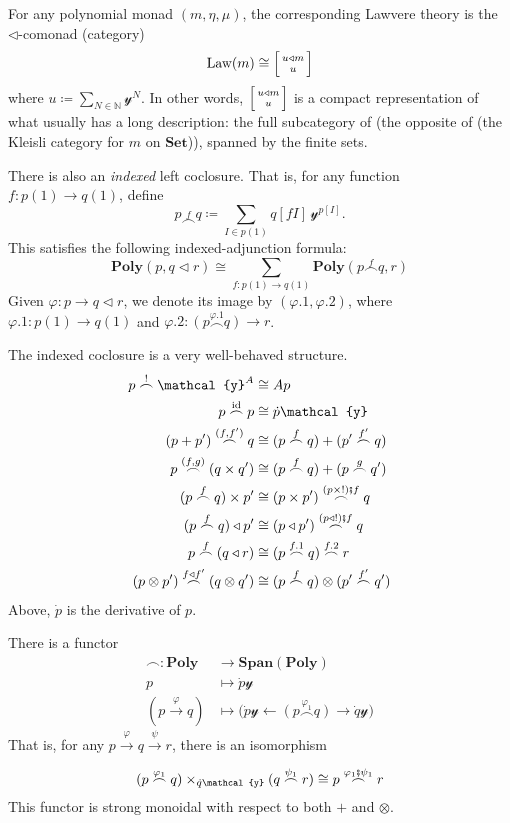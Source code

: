\documentclass[11pt, one side, article]{memoir}
\makeatletter
\theoremstyle{definition}
\theoremstyle{plain}
\newcommand{\Cat}[1]{\mathbf{#1}}%
\newcommand{\id}{\mathrm{id}}
\newcommand{\then}{\mathbin{\fatsemi}}
\newcommand{\To}[2][]{\xrightarrow[#1]{#2}}
\newcommand{\from}{\leftarrow}
\newcommand{\nn}{\mathbb{N}}
\newcommand{\smset}{\Cat{Set}}
\newcommand{\yon}{\mathcal{y}}
\newcommand{\poly}{\Cat{Poly}}
\newcommand{\Span}{\Cat{Span}}
\newcommand{\0}{\textsf{0}}
\newcommand{\1}{\tn{\textsf{1}}}
\newcommand{\tri}{\mathbin{\triangleleft}}
\newcommand{\bigcocl}[2]{
     \begin{bmatrix}{\vphantom{f_f^f}#2} \\ {\vphantom{f_f^f}#1} \end{bmatrix}
}
\newcommand{\littlecocl}[2]{
     \begin{bsmallmatrix}{\vphantom{f}#2} \\ {\vphantom{f}#1} \end{bsmallmatrix}
}
\newcommand{\cocr}[2]{
  \relax\if@display
     \bigcocl{#1}{#2}
  \else
     \littlecocl{#1}{#2}
  \fi
}
\newcommand{\cocl}[1]{\overset{#1}{\frown}}
\makeatother
\begin{document}
For any polynomial monad $(m,\eta,\mu)$, the corresponding Lawvere theory is the $\tri$-comonad (category)
\begin{equation}
	\text{Law}(m)\cong\cocr{u}{u\tri m}
\end{equation}
where $u\coloneqq\sum_{N\in\nn}\yon^N$. In other words, $\cocr{u}{u\tri m}$ is a compact representation of what usually has a long description: the full subcategory of (the opposite of (the Kleisli category for $m$ on $\smset$)), spanned by the finite sets.

There is also an \emph{indexed} left coclosure. That is, for any function $f\colon p(1)\to q(1)$, define
\begin{equation}
	p\cocl{f}q\coloneqq \sum_{I\in p(1)}q[fI]\,\yon^{p[I]}.
\end{equation}
This satisfies the following indexed-adjunction formula:
\begin{equation}
	\poly(p,q\tri r)\cong\sum_{f\colon p(1)\to q(1)}\poly(p\cocl{f}q,r)
\end{equation}
Given $\varphi\colon p\to q\tri r$, we denote its image by $(\varphi.1,\varphi.2)$, where $\varphi.1\colon p(1)\to q(1)$ and $\varphi.2\colon (p\cocl{\varphi.1}q)\to r$.

The indexed coclosure is a very well-behaved structure.
\begin{align*}
	p\cocl{!}\yon^A&\cong Ap\\
	p\cocl{\id}p&\cong\dot{p}\yon\\
	(p+p')\cocl{(f,f')}q&\cong(p\cocl{f}q)+(p'\cocl{f'}q)\\
	p\cocl{(f,g)}(q\times q')&\cong(p\cocl{f}q)+(p\cocl{g}q')\\
	(p\cocl{f}q)\times p'&\cong(p\times p')\cocl{(p\times!)\then f}q\\
	(p\cocl{f}q)\tri p'&\cong(p\tri p')\cocl{(p\tri!)\then f}q\\
	p\cocl{f}(q\tri r)&\cong(p\cocl{f.1}q)\cocl{f.2}r\\
	(p\otimes p')\cocl{f\tri f'}(q\otimes q')&\cong(p\cocl{f}q)\otimes(p'\cocl{f'}q')\\
\end{align*}
Above, $\dot{p}$ is the derivative of $p$.

There is a functor
\begin{equation}
\begin{aligned}
	\frown\colon\poly&\to\Span(\poly)\\
	p&\mapsto\dot{p}\yon\\
	(p\To{\varphi}q)&\mapsto\big(\dot{p}\yon\from(p\cocl{\varphi_1}q)\to\dot{q}\yon\big)
\end{aligned}
\end{equation}
That is, for any $p\To{\varphi}q\To{\psi}r$, there is an isomorphism
\begin{equation}
	(p\cocl{\varphi_1}q)\times_{\dot{q}\yon}(q\cocl{\psi_1}r)\cong p\cocl{\varphi_1\then\psi_1}r
\end{equation}
This functor is strong monoidal with respect to both $+$ and $\otimes$.
\end{document}
